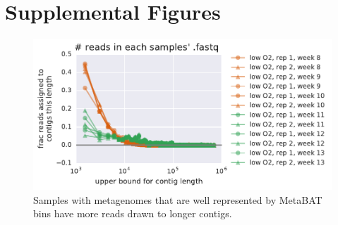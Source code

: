 \section{Supplemental Figures}

\begin{figure}[H]
\centering
    \includegraphics[width=1.0\textwidth]{./tex/chapter2/figures/170124_bad_low_o2_samples_have_more_reads_on_short_contigs--binning_not_considered.pdf}
    \begin{singlespace}
    \caption[Samples best explained by bins have more reads drawn to longer contigs.]{
        Samples with metagenomes that are well represented by MetaBAT bins have more reads drawn to longer contigs.}
    \label{fig:contig_dist}
    \end{singlespace}
\end{figure}




